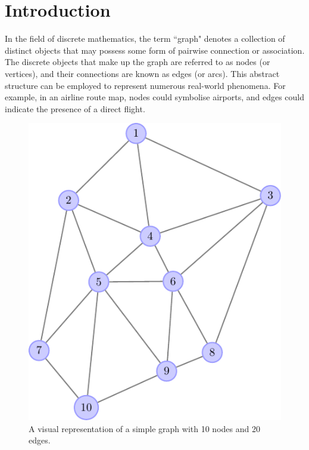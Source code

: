 


\pagestyle{fancy} 


\chapter{Introduction} 

\label{chap:ntroduction} 



In the field of discrete mathematics, the term ``graph" denotes a collection of distinct objects that may possess some form of pairwise connection or association. The discrete objects that make up the graph are referred to as nodes (or vertices), and their connections are known as edges (or arcs). This abstract structure can be employed to represent numerous real-world phenomena. For example, in an airline route map, nodes could symbolise airports, and edges could indicate the presence of a direct flight.

\vspace{0.1cm}

\begin{figure}
	\centering
		\includegraphics[width=\linewidth]{Figures/graph_plot.pdf}
	\caption[A visual representation of a simple graph]{A visual representation of a simple graph with 10 nodes and 20 edges.}
	\label{fig:basic_graph}
\end{figure}


